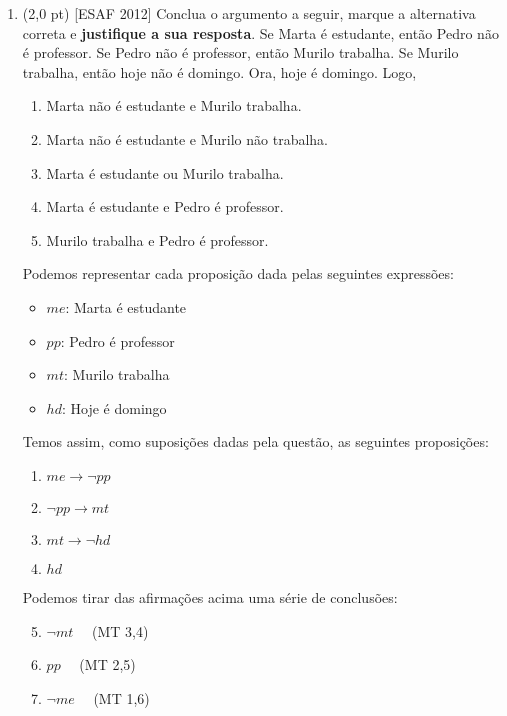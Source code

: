 \documentclass[11pt,a4paper,oneside]{article}
\begin{document}
\begin{enumerate}

	\item (2,0 pt) [ESAF 2012] Conclua o argumento a seguir, marque a alternativa correta e {\bf justifique a sua resposta}. Se Marta é estudante, então Pedro não é professor. Se Pedro não é professor, então Murilo trabalha. Se Murilo trabalha, então hoje não é domingo. Ora, hoje é domingo. Logo,
	
		\begin{enumerate}
			\item Marta não é estudante e Murilo trabalha.
			\item Marta não é estudante e Murilo não trabalha.
			\item Marta é estudante ou Murilo trabalha.
			\item Marta é estudante e Pedro é professor.
			\item Murilo trabalha e Pedro é professor.
		\end{enumerate}
		
		{\color{verde} 
			Podemos representar cada proposição dada pelas seguintes expressões:
			\begin{itemize}
				\item $me$: Marta é estudante
				\item $pp$: Pedro é professor
				\item $mt$: Murilo trabalha
				\item $hd$: Hoje é domingo
			\end{itemize}
			
			Temos assim, como suposições dadas pela questão, as seguintes proposições:
			\begin{enumerate}[(1)]
				\item $me \rightarrow \neg pp$
				\item $\neg pp \rightarrow mt$
				\item $mt \rightarrow \neg hd$
				\item $hd$
			\end{enumerate}
			
			Podemos tirar das afirmações acima uma série de conclusões:
			\begin{enumerate}[(1)]
				\setcounter{enumii}{4}
				\item $\neg mt$ \ \ (MT 3,4)
				\item $pp$ \ \ (MT 2,5)
				\item $\neg me$ \ \ (MT 1,6)
			\end{enumerate}
			
}
\end{enumerate}
\end{document}
